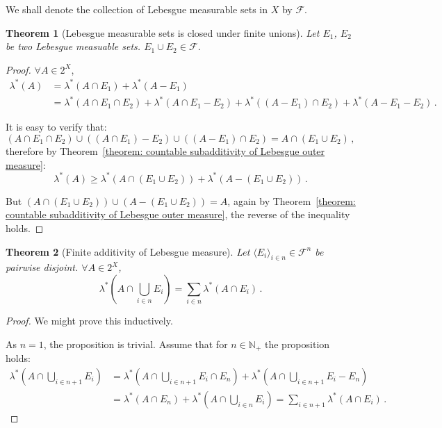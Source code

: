 \documentclass[openany]{book}
\theoremstyle{plain}
\newtheorem{theorem}{Theorem}[section] %
\theoremstyle{definition}
\begin{document}
We shall denote the collection of Lebesgue measurable sets in $X$ by $\mathscr F$.

\begin{theorem}[Lebesgue measurable sets is closed under finite unions]
	\label{theorem: Lebesgue measurable sets is closed under finite unions}
	Let $E_1$, $E_2$ be two Lebesgue measuable sets. 
	$E_1 \cup E_2 \in \mathscr F$.
\end{theorem}
\begin{proof}
	$\forall A \in 2^X$, 
	\begin{align*}
		\lambda^*(A) 
			&= \lambda^*(A \cap E_1) + \lambda^*(A - E_1)
		\\
			&= \lambda^*(A \cap E_1 \cap E_2) + \lambda^*(A \cap E_1 - E_2)
		+ \lambda^*((A - E_1) \cap E_2) + \lambda^*(A - E_1 - E_2)\,.
	\end{align*}

	It is easy to verify that:
	\begin{equation*}
		(A \cap E_1 \cap E_2) \cup ((A \cap E_1) - E_2) \cup ((A - E_1) \cap E_2)
		= A \cap (E_1 \cup E_2)\,,
	\end{equation*}
	therefore by Theorem~\ref{theorem: countable subadditivity of Lebesgue outer measure}:
	\begin{equation*}
		\lambda^*(A) \geq \lambda^*(A \cap (E_1 \cup E_2)) + \lambda^*(A - (E_1 \cup E_2))\,.
	\end{equation*}

	But $(A \cap (E_1 \cup E_2)) \cup (A - (E_1 \cup E_2)) = A$, again by Theorem~\ref{theorem: countable subadditivity of Lebesgue outer measure}, the reverse of the inequality holds.
\end{proof}

\begin{theorem}[Finite additivity of Lebesgue measure]
	\label{theorem: finite additivity of Lebesgue measure}
	Let $\langle E_i \rangle_{i \in n} \in \mathscr F^n$ be pairwise disjoint.
	$\forall A \in 2^X$, 
	\begin{equation*}
		\lambda^*\left(A \cap \bigcup_{i \in n} E_i \right)
		= \sum_{i \in n} \lambda^* (A \cap E_i)\,.
	\end{equation*}
\end{theorem}
\begin{proof}
	We might prove this inductively.

	As $n = 1$, the proposition is trivial. Assume that for $n \in \mathbb N_+$ the proposition holds:
	\begin{align*}
		\lambda^*\left( A \cap \bigcup_{i \in n + 1} E_i \right)
		&= \lambda^*\left( A \cap \bigcup_{i \in n + 1} E_i \cap E_n \right)
		+  \lambda^*\left( A \cap \bigcup_{i \in n + 1} E_i - E_n \right)
		\\
		&= \lambda^*( A \cap E_n ) + \lambda^*\left( A \cap \bigcup_{i \in n} E_i \right)
		= \sum_{i \in n + 1} \lambda^*(A \cap E_i)\,.
	\end{align*}
\end{proof}
\end{document}

